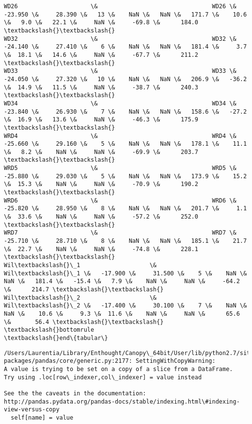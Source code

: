 \documentclass{article}
\begin{document}
\begin{Verbatim}[commandchars=\\\{\}]
WD26                     \&                                 WD26 \&   -23.950 \&     28.390 \&   13 \&    NaN \&   NaN \&   171.7 \&    10.6 \&   9.0 \&   22.1 \&     NaN \&     -69.8 \&      184.0 \textbackslash{}\textbackslash{}
WD32                     \&                                 WD32 \&   -24.140 \&     27.410 \&    6 \&    NaN \&   NaN \&   181.4 \&     3.7 \&  18.1 \&   14.6 \&     NaN \&     -67.7 \&      211.2 \textbackslash{}\textbackslash{}
WD33                     \&                                 WD33 \&   -24.050 \&     27.320 \&   10 \&    NaN \&   NaN \&   206.9 \&   -36.2 \&  14.9 \&   11.5 \&     NaN \&     -38.7 \&      240.3 \textbackslash{}\textbackslash{}
WD34                     \&                                 WD34 \&   -23.840 \&     26.930 \&    7 \&    NaN \&   NaN \&   158.6 \&   -27.2 \&  16.9 \&   13.6 \&     NaN \&     -46.3 \&      175.9 \textbackslash{}\textbackslash{}
WRD4                     \&                                 WRD4 \&   -25.660 \&     29.160 \&    5 \&    NaN \&   NaN \&   178.1 \&    11.1 \&   8.2 \&    NaN \&     NaN \&     -69.9 \&      203.7 \textbackslash{}\textbackslash{}
WRD5                     \&                                 WRD5 \&   -25.880 \&     29.030 \&    5 \&    NaN \&   NaN \&   173.9 \&    15.2 \&  15.3 \&    NaN \&     NaN \&     -70.9 \&      190.2 \textbackslash{}\textbackslash{}
WRD6                     \&                                 WRD6 \&   -25.820 \&     28.950 \&    8 \&    NaN \&   NaN \&   201.7 \&     1.1 \&  33.6 \&    NaN \&     NaN \&     -57.2 \&      252.0 \textbackslash{}\textbackslash{}
WRD7                     \&                                 WRD7 \&   -25.710 \&     28.710 \&    8 \&    NaN \&   NaN \&   185.1 \&    21.7 \&  22.7 \&    NaN \&     NaN \&     -74.8 \&      228.1 \textbackslash{}\textbackslash{}
Wil\textbackslash{}\_1                    \&                                Wil\textbackslash{}\_1 \&   -17.900 \&     31.500 \&    5 \&    NaN \&   NaN \&   181.4 \&   -15.4 \&   7.9 \&    NaN \&     NaN \&     -64.2 \&      214.7 \textbackslash{}\textbackslash{}
Wil\textbackslash{}\_2                    \&                                Wil\textbackslash{}\_2 \&   -17.400 \&     30.100 \&    7 \&    NaN \&   NaN \&    10.6 \&     9.3 \&  11.6 \&    NaN \&     NaN \&      65.6 \&       56.4 \textbackslash{}\textbackslash{}
\textbackslash{}bottomrule
\textbackslash{}end\{tabular\}
    \end{Verbatim}

    \begin{Verbatim}[commandchars=\\\{\}]
/Users/Laurentia/Library/Enthought/Canopy\_64bit/User/lib/python2.7/site-packages/pandas/core/generic.py:2177: SettingWithCopyWarning: 
A value is trying to be set on a copy of a slice from a DataFrame.
Try using .loc[row\_indexer,col\_indexer] = value instead

See the the caveats in the documentation: http://pandas.pydata.org/pandas-docs/stable/indexing.html\#indexing-view-versus-copy
  self[name] = value
    \end{Verbatim}
\end{document}
